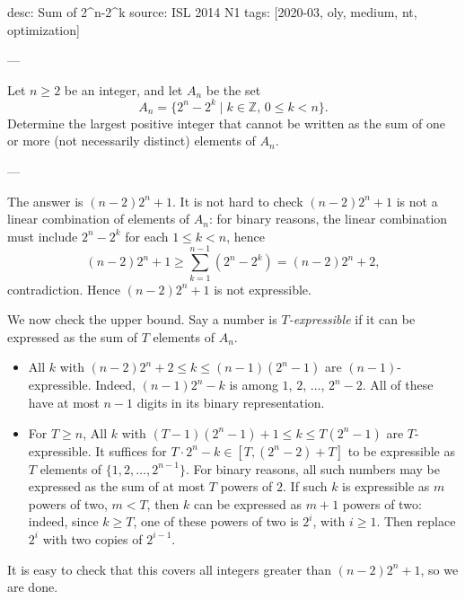 desc: Sum of 2^n-2^k
source: ISL 2014 N1
tags: [2020-03, oly, medium, nt, optimization]

---

Let $n\ge 2$ be an integer, and let $A_n$ be the set \[A_n=\{2^n-2^k\mid k\in\mathbb Z,\, 0\le k<n\}.\]
Determine the largest positive integer that cannot be written as the sum of one or more (not necessarily distinct) elements of $A_n$.

---

The answer is $(n-2)2^n+1$. It is not hard to check $(n-2)2^n+1$ is not a linear combination of elements of $A_n$: for binary reasons, the linear combination must include $2^n-2^k$ for each $1\le k<n$, hence \[(n-2)2^n+1\ge\sum_{k=1}^{n-1}\left(2^n-2^k\right)=(n-2)2^n+2,\]
contradiction. Hence $(n-2)2^n+1$ is not expressible.

We now check the upper bound. Say a number is \emph{$T$-expressible} if it can be expressed as the sum of $T$ elements of $A_n$.
\begin{itemize}
    \item All $k$ with $(n-2)2^n+2\le k\le(n-1)(2^n-1)$ are $(n-1)$-expressible. Indeed, $(n-1)2^n-k$ is among $1$, $2$, $\ldots$, $2^n-2$. All of these have at most $n-1$ digits in its binary representation.
    \item For $T\ge n$, All $k$ with $(T-1)(2^n-1)+1\le k\le T(2^n-1)$ are $T$-expressible. It suffices for $T\cdot2^n-k\in[T,(2^n-2)+T]$ to be expressible as $T$ elements of $\{1,2,\ldots,2^{n-1}\}$. For binary reasons, all such numbers may be expressed as the sum of at most $T$ powers of $2$. If such $k$ is expressible as $m$ powers of two, $m<T$, then $k$ can be expressed as $m+1$ powers of two: indeed, since $k\ge T$, one of these powers of two is $2^i$, with $i\ge1$. Then replace $2^i$ with two copies of $2^{i-1}$.
\end{itemize}
It is easy to check that this covers all integers greater than $(n-2)2^n+1$, so we are done.
